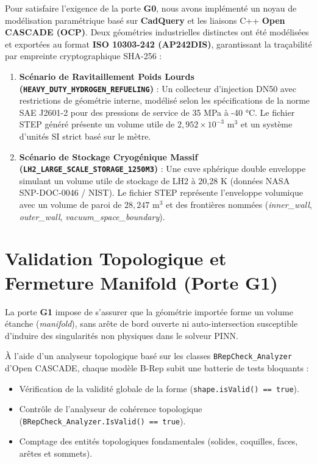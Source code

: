 \documentclass[12pt,a4paper,oneside]{report}
\begin{document}
Pour satisfaire l'exigence de la porte \textbf{G0}, nous avons implémenté un noyau de modélisation paramétrique basé sur \textbf{CadQuery} et les liaisons C++ \textbf{Open CASCADE (OCP)}. Deux géométries industrielles distinctes ont été modélisées et exportées au format \textbf{ISO 10303-242 (AP242DIS)}, garantissant la traçabilité par empreinte cryptographique SHA-256 :

\begin{enumerate}
    \item \textbf{Scénario de Ravitaillement Poids Lourds (\texttt{HEAVY\_DUTY\_HYDROGEN\_REFUELING})} : Un collecteur d'injection DN50 avec restrictions de géométrie interne, modélisé selon les spécifications de la norme SAE J2601-2 pour des pressions de service de 35 MPa à -40 °C. Le fichier STEP généré présente un volume utile de $2,952 \times 10^{-3}\text{ m}^3$ et un système d'unités SI strict basé sur le mètre.
    \item \textbf{Scénario de Stockage Cryogénique Massif (\texttt{LH2\_LARGE\_SCALE\_STORAGE\_1250M3})} : Une cuve sphérique double enveloppe simulant un volume utile de stockage de LH2 à 20,28 K (données NASA SNP-DOC-0046 / NIST). Le fichier STEP représente l'enveloppe volumique avec un volume de paroi de $28,247\text{ m}^3$ et des frontières nommées (\textit{inner\_wall}, \textit{outer\_wall}, \textit{vacuum\_space\_boundary}).
\end{enumerate}

\section{Validation Topologique et Fermeture Manifold (Porte G1)}
La porte \textbf{G1} impose de s'assurer que la géométrie importée forme un volume étanche (\textit{manifold}), sans arête de bord ouverte ni auto-intersection susceptible d'induire des singularités non physiques dans le solveur PINN.

À l'aide d'un analyseur topologique basé sur les classes \texttt{BRepCheck\_Analyzer} d'Open CASCADE, chaque modèle B-Rep subit une batterie de tests bloquants :
\begin{itemize}
    \item Vérification de la validité globale de la forme (\texttt{shape.isValid() == true}).
    \item Contrôle de l'analyseur de cohérence topologique (\texttt{BRepCheck\_Analyzer.IsValid() == true}).
    \item Comptage des entités topologiques fondamentales (solides, coquilles, faces, arêtes et sommets).
\end{itemize}
\end{document}
